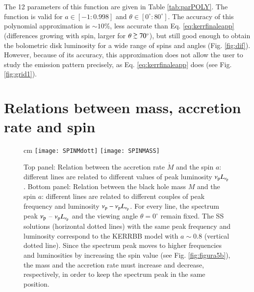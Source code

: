 \documentclass{aa}
\def\spose#1{\hbox to 0pt{#1\hss}}
\newcommand\gsim{\mathrel{\spose{\lower 3pt\hbox{$\mathchar"218$}}
     \raise 2.0pt\hbox{$\mathchar"13E$}}}
\begin{document}
The 12 parameters of this function are given in Table \ref{tab:parPOLY}. The function is valid for $a \in [-1:0.998]$ and $\theta \in [0^{\circ}:80^{\circ}]$. The accuracy of this polynomial approximation is $\sim 10 \%$, less accurate than Eq. \ref{eq:kerrfinaleapp} (differences growing with spin, larger for $\theta \gsim 70^{\circ}$), but still good enough to obtain the bolometric disk luminosity for a wide range of spins and angles (Fig. \ref{fig:dif}). However, because of its accuracy, this approximation does not allow the user to study the emission pattern precisely, as Eq. \ref{eq:kerrfinaleapp} does (see Fig. \ref{fig:grid1}).








\section{Relations between mass, accretion rate and spin}

\begin{figure}
\centering
{} cm
\vspace{1mm} \texttt{[image: SPINMdott]} \texttt{[image: SPINMASS]}
\caption{Top panel: Relation between the accretion rate $\dot{M}$ and the spin $a$: different lines are related to different values of peak luminosity $\nu_{\rm p} L_{\nu_{\rm p}}$. Bottom panel: Relation between the black hole mass $M$ and the spin $a$: different lines are related to different couples of peak frequency and luminosity $\nu_{\rm p} - \nu_{\rm p} L_{\nu_{\rm p}}$. For every line, the spectrum peak $\nu_{\rm p}$ -- $\nu_{\rm p} L_{\nu_{\rm p}}$ and the viewing angle $\theta=0^{\circ}$ remain fixed. The SS solutions (horizontal dotted lines) with the same peak frequency and luminosity correspond to the KERRBB model with $a \sim 0.8$ (vertical dotted line). Since the spectrum peak moves to higher frequencies and luminosities by increasing the spin value (see Fig. \ref{fig:figura5b}), the mass and the accretion rate must increase and decrease, respectively, in order to keep the spectrum peak in the same position.}
\label{SMMdot}
\end{figure}
\end{document}
